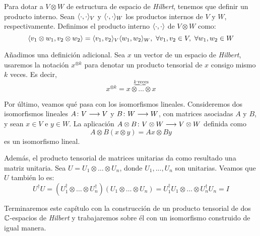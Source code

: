 Para dotar a $V\otimes W$ de estructura de espacio de \textit{Hilbert}, tenemos que definir un producto interno. Sean $\langle\cdot,\cdot\rangle_V$ y $\langle\cdot,\cdot\rangle_W$ los productos internos de $V$ y $W$, respectivamente. Definimos el producto interno $\langle\cdot,\cdot\rangle$ de $V\otimes W$ como:
$$\dotproduct{v_1\otimes w_1}{v_2\otimes w_2}=\dotproduct{v_1}{v_2}_V\dotproduct{w_1}{w_2}_W,\ \forall v_1,v_2\in V,\ \forall w_1,w_2\in W
$$

Añadimos una definición adicional. Sea $x$ un vector de un espacio de \textit{Hilbert}, usaremos la notación $x^{\otimes k}$ para denotar un producto tensorial de $x$ consigo mismo $k$ veces. Es decir,
$$x^{\otimes k}=\overset{\underbrace{k\mathrm{\ veces}}}{x\otimes \hdots \otimes x}$$

Por último, veamos qué pasa con los isomorfismos lineales. Consideremos dos isomorfismos lineales $A\colon V\longrightarrow V$ y \newline $B\colon W\longrightarrow W$,  con matrices asociadas $A$ y $B$, y sean $x\in V$ e $y\in W$. La aplicación $A\otimes B\colon V\otimes W\longrightarrow V\otimes W$ definida como
\begin{equation}
\label{eq:eq36}
A\otimes B(x\otimes y) = Ax\otimes By
\end{equation}
es un isomorfismo lineal.

Además, el producto tensorial de matrices unitarias da como resultado una matriz unitaria. Sea $U=U_1\otimes\hdots\otimes U_n$, donde $U_1,...,U_n$ son unitarias. Veamos que $U$ también lo es:
\[U^\dag U = (U_1^\dag\otimes\hdots\otimes U_n^\dag)(U_1\otimes\hdots\otimes U_n)=U_1^\dag U_1\otimes\hdots\otimes U_n^\dag U_n = I\]

Terminaremos este capítulo con la construcción de un producto tensorial de dos $\mathbb{C}$-espacios de \textit{Hilbert} y trabajaremos sobre él con un isomorfismo construido de igual manera.

